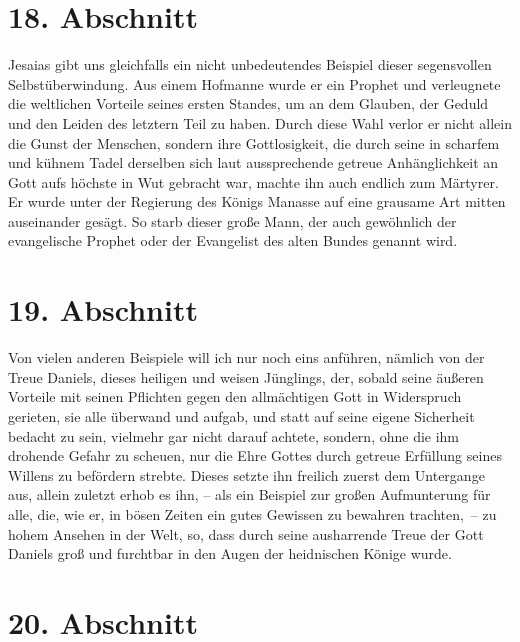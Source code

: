 \section{18. Abschnitt} \label{kap4_ab18}

 Jesaias gibt uns gleichfalls ein nicht unbedeutendes
Beispiel dieser
segensvollen Selbstüberwindung. Aus einem Hofmanne wurde er ein Prophet und
verleugnete die weltlichen Vorteile seines ersten Standes, um an dem Glauben,
der Geduld und den Leiden des letztern Teil zu haben. Durch diese Wahl verlor er
nicht allein die Gunst der Menschen, sondern ihre Gottlosigkeit, die durch seine
in scharfem und kühnem Tadel derselben sich laut aussprechende getreue
Anhänglichkeit an Gott aufs höchste in Wut gebracht war, machte ihn auch
endlich zum Märtyrer. Er wurde unter der Regierung
des Königs
Manasse auf eine
grausame Art mitten auseinander gesägt. So starb dieser große Mann, der auch
gewöhnlich der evangelische Prophet oder der Evangelist des alten
Bundes genannt wird.

\section{19. Abschnitt} \label{kap4_ab19}

Von vielen anderen Beispiele will ich nur noch eins anführen, nämlich von der
Treue Daniels, dieses heiligen
 und
weisen Jünglings, der, sobald seine äußeren
Vorteile mit seinen Pflichten gegen den allmächtigen Gott in Widerspruch
gerieten, sie alle überwand und aufgab, und statt auf seine eigene
Sicherheit bedacht zu sein, vielmehr gar nicht darauf achtete, sondern, ohne die
ihm drohende Gefahr zu scheuen, nur die Ehre Gottes durch getreue Erfüllung
seines Willens zu befördern strebte. Dieses setzte ihn freilich zuerst dem
Untergange aus, allein zuletzt erhob es ihn, -- als ein Beispiel zur großen
Aufmunterung für alle, die, wie er, in bösen Zeiten ein gutes Gewissen zu
bewahren trachten,~-- zu hohem Ansehen in der Welt, so, dass durch seine
ausharrende Treue der Gott Daniels groß und furchtbar in den Augen der
heidnischen Könige wurde.

\section{20. Abschnitt} \label{kap4_ab20}

